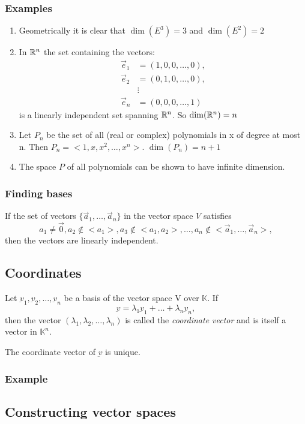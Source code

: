 \subsubsection{Examples}
\begin{enumerate}[label=(\alph*)]
    \item Geometrically it is clear that $ \dim(E^3) = 3 $ and $ \dim(E^2) = 2 $
    \item In $ \mathbb{R}^n $ the set containing the vectors: \begin{align*}
        \vec{e}_1 &= (1,0,0,\dots,0), \\
        \vec{e}_2 &= (0,1,0,\dots,0), \\
                  &\vdots \\
        \vec{e}_n &= (0,0,0,\dots,1)
    \end{align*}
    is a linearly independent set spanning $ \mathbb{R}^n $. So $ \dim(\mathbb{R}^n) = n $
    \item Let $ P_n $ be the set of all (real or complex) polynomials in x of degree at most n.
    Then $ P_n = <1,x,x^2,\dots,x^n> $. $ \dim(P_n) = n+1 $
    \item The space $P$ of all polynomials can be shown to have infinite dimension.
\end{enumerate}


\subsubsection{Finding bases}
\begin{theorem}[]
    If the set of vectors $ \{\vec{a}_1,\dots,\vec{a}_n\} $ in the vector space $V$ satisfies
    $$ a_1 \ne \vec{0}, a_2 \notin <a_1>, a_3 \notin <a_1,a_2>, \dots, a_n \notin <\vec{a}_1, \dots, \vec{a}_n>, $$
    then the vectors are linearly independent.
\end{theorem}


\subsection{Coordinates}
\begin{definition}[(Coordinates)]
    Let $ \underbar{v}_1, \underbar{v}_2, \dots, \underbar{v}_n $ be a basis of the vector space V
    over $\mathbb{K}$. If
    $$ \underbar{v} = \lambda_1\underbar{v}_1 + \dots + \lambda_n\underbar{v}_n, $$
    then the vector $ (\lambda_1, \lambda_2, \dots, \lambda_n) $ is called the \emph{coordinate vector} and is itself a vector in $\mathbb{K}^n$.

    \begin{nb}
        The coordinate vector of $\underbar{v}$ is unique.
    \end{nb}
\end{definition}

\subsubsection{Example}

\subsection{Constructing vector spaces}

